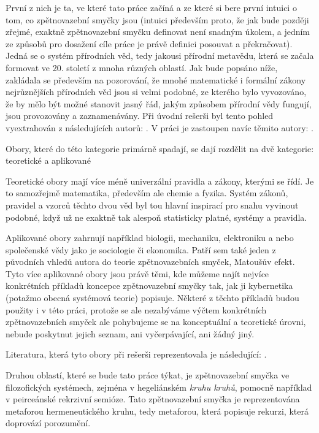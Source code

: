 \documentclass[11pt,a4paper]{article}
\begin{document}
První z nich je ta, ve které tato práce začíná a ze které si bere první intuici o tom, co zpětnovazební smyčky jsou (intuici především proto, že jak bude později zřejmé, exaktně zpětnovazební smyčku definovat není snadným úkolem, a jedním ze způsobů pro dosažení cíle práce je právě definici posouvat a překračovat). Jedná se o systém přírodních věd, tedy jakousi přírodní metavědu, která se začala formovat ve 20. století z mnoha různých oblastí. Jak bude popsáno níže, zakládala se především na pozorování, že mnohé matematické i formální zákony nejrůznějších přírodních věd jsou si velmi podobné, ze kterého bylo vyvozováno, že by mělo být možné stanovit jasný řád, jakým způsobem přírodní vědy fungují, jsou provozovány a zaznamenávány. 
Při úvodní rešerši byl tento pohled vyextrahován z následujících autorů: \cite{gleick_chaos_1998, wiener_cybernetics_2019, ashby_introduction_2015, astrom_feedback_2021, mindell_between_2002}. V práci je zastoupen navíc těmito autory: \cite{von_bertalanffy_outline_1950, strauss_scope_2002}.

Obory, které do této kategorie primárně spadají, se dají rozdělit na dvě kategorie: teoretické a aplikované

Teoretické obory mají více méně univerzální pravidla a zákony, kterými se řídí. Je to samozřejmě matematika, především ale chemie a fyzika. Systém zákonů, pravidel a vzorců těchto dvou věd byl tou hlavní inspirací pro snahu vyvinout podobné, když už ne exaktně tak alespoň statisticky platné, systémy a pravidla.

Aplikované obory zahrnují například biologii, mechaniku, elektroniku a nebo společenské vědy jako je sociologie či ekonomika. Patří sem také jeden z původních vhledů autora do teorie zpětnovazebních smyček, Matoušův efekt. Tyto více aplikované obory jsou právě těmi, kde můžeme najít nejvíce konkrétních příkladů koncepce zpětnovazební smyčky tak, jak ji kybernetika (potažmo obecná systémová teorie) popisuje. Některé z těchto příkladů budou použity i v této práci, protože se ale nezabýváme výčtem konkrétních zpětnovazebních smyček ale pohybujeme se na konceptuální a teoretické úrovni, nebude poskytnut jejich seznam, ani vyčerpávající, ani žádný jiný.

Literatura, která tyto obory při rešerši reprezentovala je následující: \cite{ramaprasad_definition_1983, rigney_matthew_2010, soares_review_2011, skraba_group_2003, carver_self-regulation_1998, favari_megaproject_2020}.

Druhou oblastí, které se bude tato práce týkat, je zpětnovazební smyčka ve filozofických systémech, zejména v hegeliánském \textit{kruhu kruhů}, pomocně například v peirceánské rekrzivní semióze. Tato zpětnovazební smyčka je reprezentována metaforou hermeneutického kruhu, tedy metaforou, která popisuje rekurzi, která doprovází porozumění. 
\end{document}
